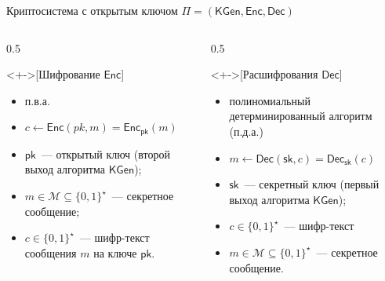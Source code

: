 \documentclass[aspectratio=169, 12pt]{beamer}
\newcommand{\algo}[1]{\mathsf{#1}}
\begin{document}
\begin{frame}[label={sec:org6680ddc}]{Криптосистема с открытым ключом \(\Pi=(\algo{KGen}, \algo{Enc}, \algo{Dec})\)}
    \begin{columns}[t]
        \begin{column}{0.5\columnwidth}
            \begin{definition}<+->[Шифрование \(\algo{Enc}\)]\label{sec:org6bb89cf}
                \begin{itemize}[<+->]
                    \item п.в.а.
                    \item \(c\gets \algo{Enc}(pk,m)=\algo{Enc}_{\algo{pk}}(m)\)
                    \item \(\algo{pk}\)~--- открытый ключ (второй выход алгоритма \(\algo{KGen}\));
                    \item \(m\in\mathcal{M}\subseteq \{0,1\}^{\star}\)~--- \alert{секретное  сообщение};
                    \item \(c\in \{0,1\}^{\star}\)~--- \alert{шифр-текст} сообщения \(m\) на ключе \(\algo{pk}\).
                \end{itemize}
            \end{definition}
        \end{column}
        \begin{column}[t]{0.5\columnwidth}
            \begin{definition}<+->[Расшифрования \(\algo{Dec}\)]\label{sec:orgc752953}
                \begin{itemize}[<+->]
                    \item полиномиальный детерминированный алгоритм (п.д.а.)
                    \item \(m \gets \algo{Dec}(\algo{sk},c)=\algo{Dec}_{\algo{sk}}(c)\)
                    \item \(\algo{sk}\)~--- секретный ключ (первый выход алгоритма \(\algo{KGen}\));
                    \item \(c\in \{0,1\}^{\star}\)~--- \alert{шифр-текст}
                    \item \(m\in\mathcal{M}\subseteq \{0,1\}^{\star}\)~--- \alert{секретное сообщение}.
                \end{itemize}
            \end{definition}
        \end{column}
    \end{columns}
\end{frame}
\end{document}
